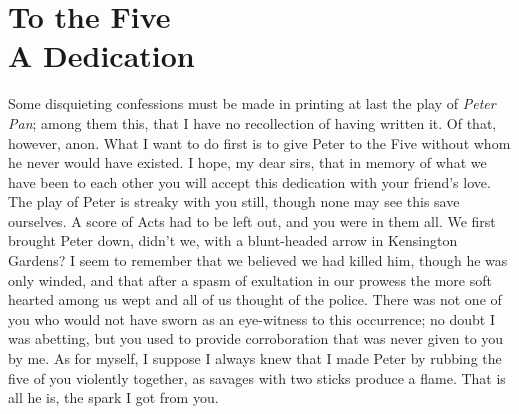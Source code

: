 
\section[Dedication: To the Five]{To the Five\\A Dedication}

Some disquieting confessions must be made in printing at last the play of \emph{Peter Pan};
among them this, that I have no recollection of having written it.
Of that, however, anon.
What I want to do first is to give Peter to the Five without whom he never would have existed.
I hope, my dear sirs,
that in memory of what we have been to each other
you will accept this dedication with your friend’s love.
The play of Peter is streaky with you still,
though none may see this save ourselves.
A score of Acts had to be left out, and you were in them all.
We first brought Peter down, didn’t we, with a blunt-headed arrow in Kensington Gardens?
I seem to remember that we believed we had killed him,
though he was only winded,
and that after a spasm of exultation in our prowess
the more soft hearted among us wept and all of us thought of the police.
There was not one of you who would not have sworn as an eye-witness to this occurrence;
no doubt I was abetting,
but you used to provide corroboration that was never given to you by me.
As for myself,
I suppose I always knew that I made Peter by rubbing the five of you violently together,
as savages with two sticks produce a flame.
That is all he is, the spark I got from you.

